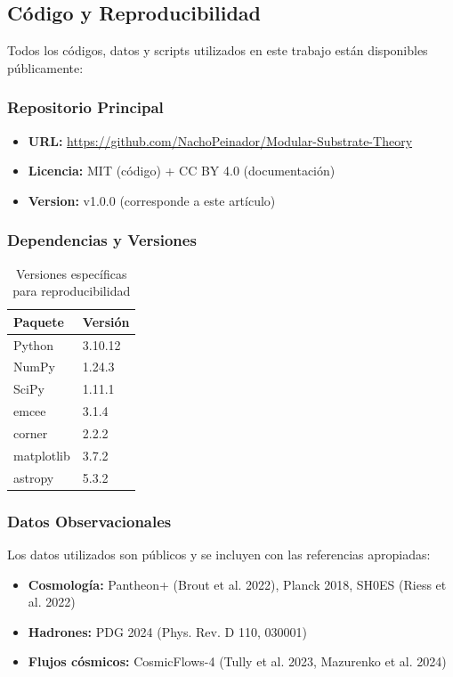 \documentclass[11pt, a4paper]{article}
\theoremstyle{plain}
\theoremstyle{definition}
\begin{document}
\subsection{Código y Reproducibilidad}
\label{app:reproducibilidad}

Todos los códigos, datos y scripts utilizados en este trabajo están disponibles públicamente:

\subsubsection{Repositorio Principal}
\begin{itemize}
    \item \textbf{URL:} \url{https://github.com/NachoPeinador/Modular-Substrate-Theory}
    \item \textbf{Licencia:} MIT (código) + CC BY 4.0 (documentación)
    \item \textbf{Version:} v1.0.0 (corresponde a este artículo)
\end{itemize}

\subsubsection{Dependencias y Versiones}
\begin{table}[H]
\centering
\caption{Versiones específicas para reproducibilidad}
\label{tab:dependencias}
\begin{tabular}{ll}
\toprule
\textbf{Paquete} & \textbf{Versión} \\
\midrule
Python & 3.10.12 \\
NumPy & 1.24.3 \\
SciPy & 1.11.1 \\
emcee & 3.1.4 \\
corner & 2.2.2 \\
matplotlib & 3.7.2 \\
astropy & 5.3.2 \\
\bottomrule
\end{tabular}
\end{table}


\subsubsection{Datos Observacionales}
Los datos utilizados son públicos y se incluyen con las referencias apropiadas:
\begin{itemize}
    \item \textbf{Cosmología:} Pantheon+ (Brout et al. 2022), Planck 2018, SH0ES (Riess et al. 2022)
    \item \textbf{Hadrones:} PDG 2024 (Phys. Rev. D 110, 030001)
    \item \textbf{Flujos cósmicos:} CosmicFlows-4 (Tully et al. 2023, Mazurenko et al. 2024)
\end{itemize}
\end{document}
